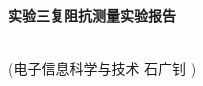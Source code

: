 \begin{center}
    {\heiti{}\textbf{实验三\quad 复阻抗测量实验报告}}\\  
    {\centerline{\kaishu{} (电子信息科学与技术 \qquad 石广钊 )}}  
\end{center}
